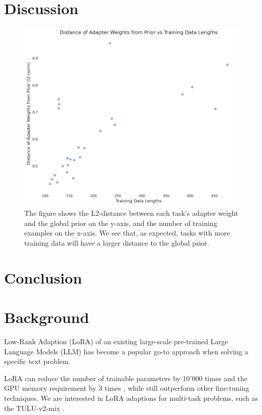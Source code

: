 \documentclass{article}
\begin{document}
\section{Discussion}
\begin{figure}[h]
    \centering
    \includegraphics[width=\textwidth]{figures/weights_vs_data_lengths.png}
    \caption{The figure shows the L2-distance between each task's adapter weight and the global prior on the y-axis, and the number of training examples on the x-axis. We see that, as expected, tasks with more training data will have a larger distance to the global prior.}
    \label{fig:weights_vs_datalen} 
\end{figure}



\section{Conclusion}

\section*{Background}
Low-Rank  Adaption (LoRA) of an existing large-scale pre-trained Large Language Models (LLM) \cite{hu_lora_2021} has become a popular go-to approach when solving a specific text problem.

LoRA can reduce the number of trainable parameters by 10'000 times and the GPU memory requirement by 3 times \cite{hu_lora_2021}, while still outperform other fine-tuning techniques.
We are interested in LoRA adaptions for multi-task problems, such as the TULU-v2-mix \cite{ivison_camels_2023}.
\end{document}
